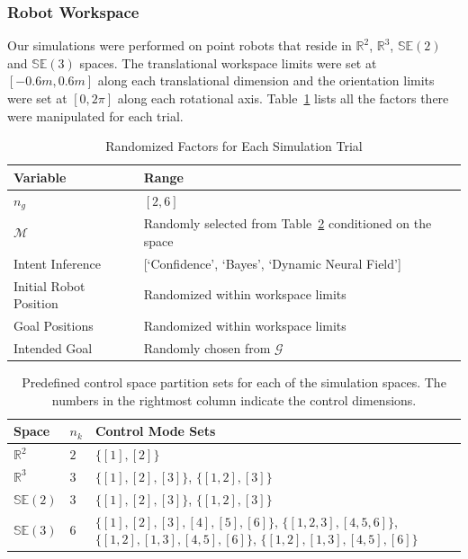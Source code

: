 \documentclass[letterpaper, 10 pt, conference]{ieeeconf}  %
\begin{document}
\subsubsection{Robot Workspace}
Our simulations were performed on point robots that reside in $\mathbb{R}^2$, $\mathbb{R}^3$, $\mathbb{SE}(2)$ and $\mathbb{SE}(3)$ spaces. The translational workspace limits were set at $[-0.6m, 0.6m]$ along each translational dimension and the orientation limits were set at $[0, 2\pi]$ along each rotational axis. Table~\ref{tbl:manip} lists all the factors there were manipulated for each trial. 
\begin{table}[h]
	\centering
	\begin{tabular}{|p{3cm}|p{3cm}|}
		\hline
		\textbf{Variable} &\textbf{Range}  \\ \hline
		$n_g$ &  $[2,6]$ \\ \hline
		$\mathcal{M}$ & Randomly selected from Table~\ref{tbl:cmp} conditioned on the space\\ \hline
		Intent Inference & [`Confidence', `Bayes', `Dynamic Neural Field'] \\ \hline
		Initial Robot Position & Randomized within workspace limits \\ \hline
		Goal Positions & Randomized within workspace limits \\ \hline
		Intended Goal & Randomly chosen from $\mathcal{G}$ \\ \hline
	\end{tabular}
	\vspace{.2cm}
	\caption{Randomized Factors for Each Simulation Trial} 
	\label{tbl:manip}
\end{table}
\begin{table}[h]
	\centering
	\begin{tabular}{|p{1cm}|p{0.5cm}|p{3cm}|}
		\hline
		\textbf{Space} & $n_k$ &\textbf{Control Mode Sets}  \\ \hline
		$\mathbb{R}^2$ & $2$ & $\{[1],[2]\}$ \\ \hline
		$\mathbb{R}^3$ & $3$ & $\{[1],[2], [3]\}$, $\{[1,2], [3]\}$ \\ \hline
		$\mathbb{SE}(2)$ & $3$ &  $\{[1],[2],[3]\}$, $\{[1,2], [3]\}$ \\ \hline
		$\mathbb{SE}(3)$ & $6$ & $\{[1],[2],[3],[4],[5],[6]\}$, $\{[1,2,3],  [4,5,6]\}$, $\{[1,2], [1,3], [4,5], [6]\}$, $\{[1,2], [1,3], [4,5], [6]\}$ \\ \hline
	\end{tabular}
	\vspace{.2cm}
	\caption{Predefined control space partition sets for each of the simulation spaces. The numbers in the rightmost column indicate the control dimensions. } 
	\label{tbl:cmp}
\end{table}
\end{document}
